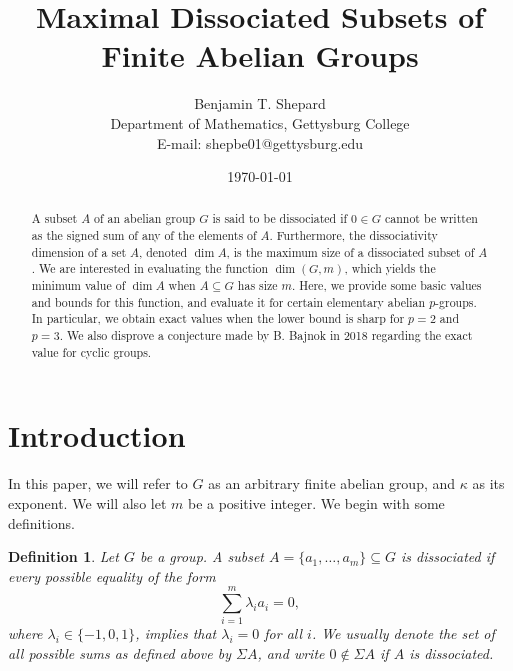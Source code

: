 \documentclass[11pt]{article}
\title{Maximal Dissociated Subsets of Finite Abelian Groups}
\author{Benjamin T. Shepard \\[.1in] Department of Mathematics, Gettysburg College \\E-mail: shepbe01@gettysburg.edu}
\date{\today}
\newcommand{\N}{\mathbb{N}}
\newcommand{\sfold}{\,_{\!\pm}\!\!\hat{}\,\,}
\newtheorem{defin}[thm]{Definition}
\begin{document}
\maketitle

\begin{abstract}
    A subset $A$ of an abelian group $G$ is said to be dissociated if $0\in G$ cannot be written as the signed sum of any of the elements of $A$. Furthermore, the dissociativity dimension of a set $A$, denoted $\dim A$, is the maximum size of a dissociated subset of $A$. We are interested in evaluating the function $\dim(G, m)$, which yields the minimum value of $\dim A$ when $A\subseteq G$ has size $m$. Here, we provide some basic values and bounds for this function, and evaluate it for certain elementary abelian $p$-groups. In particular, we obtain exact values when the lower bound is sharp for $p=2$ and $p=3$. We also disprove a conjecture made by B. Bajnok in 2018 regarding the exact value for cyclic groups.
\end{abstract}

\section{Introduction}
In this paper, we will refer to $G$ as an arbitrary finite abelian group, and $\kappa$ as its exponent. We will also let $m$ be a positive integer. We begin with some definitions.




\begin{defin}
Let $G$ be a group. A subset $A=\{a_1,\ldots,a_m\}\subseteq G$ is dissociated if every possible equality of the form
\[\sum_{i=1}^m \lambda_i a_i = 0,\]
where $\lambda_i\in\{-1,0,1\}$, implies that $\lambda_i=0$ for all $i$. We usually denote the set of all possible sums as defined above by $\Sigma A$, and write $0\notin\Sigma A$ if $A$ is dissociated.
\end{defin}
\end{document}
